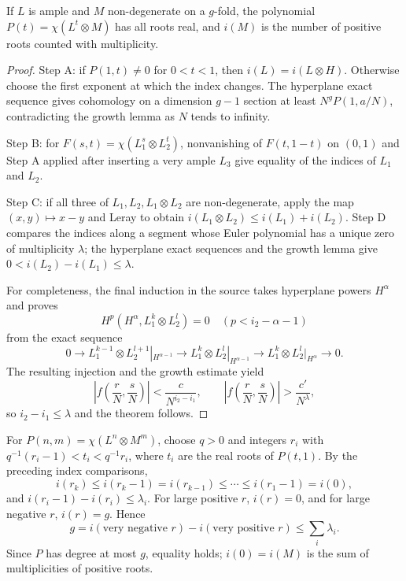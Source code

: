 \begin{theorem}
\label{mumford-thm-index-polynomial}
If $L$ is ample and $M$ non-degenerate on a $g$-fold, the polynomial
$P(t)=\chi(L^t\otimes M)$ has all roots real, and $i(M)$ is the number of
positive roots counted with multiplicity.
\end{theorem}
\begin{proof}
Step A: if $P(1,t)\ne0$ for $0<t<1$, then
$i(L)=i(L\otimes H)$. Otherwise choose the first exponent at which the
index changes. The hyperplane exact sequence gives cohomology on a
dimension $g-1$ section at least $N^gP(1,a/N)$, contradicting the growth
lemma as $N$ tends to infinity.

Step B: for $F(s,t)=\chi(L_1^s\otimes L_2^t)$, nonvanishing of
$F(t,1-t)$ on $(0,1)$ and Step A applied after inserting a very ample $L_3$
give equality of the indices of $L_1$ and $L_2$.

Step C: if all three of $L_1,L_2,L_1\otimes L_2$ are non-degenerate, apply
the map $(x,y)\mapsto x-y$ and Leray to obtain
$i(L_1\otimes L_2)\le i(L_1)+i(L_2)$. Step D compares the indices along a
segment whose Euler polynomial has a unique zero of multiplicity $\lambda$;
the hyperplane exact sequences and the growth lemma give
\(0<i(L_2)-i(L_1)\le\lambda\).

For completeness, the final induction in the source takes hyperplane powers
$H^\alpha$ and proves
\[
H^p(H^\alpha,L_1^k\otimes L_2^l)=0\quad(p<i_2-\alpha-1)
\]
from the exact sequence
\[
0\to L_1^{k-1}\otimes L_2^{l+1}|_{H^{\alpha-1}}
\to L_1^k\otimes L_2^l|_{H^{\alpha-1}}
\to L_1^k\otimes L_2^l|_{H^\alpha}\to0.
\]
The resulting injection and the growth estimate yield
\[
\left|f\left(\frac{r}{N},\frac{s}{N}\right)\right|<\frac{c}{N^{i_2-i_1}},
\qquad
\left|f\left(\frac{r}{N},\frac{s}{N}\right)\right|>\frac{c'}{N^\lambda},
\]
so $i_2-i_1\le\lambda$ and the theorem follows.
\end{proof}

\begin{remark}
\label{mumford-rem-index-root-count-conclusion}
For $P(n,m)=\chi(L^n\otimes M^m)$, choose $q>0$ and integers $r_i$ with
$q^{-1}(r_i-1)<t_i<q^{-1}r_i$, where $t_i$ are the real roots of
$P(t,1)$. By the preceding index comparisons,
\[
i(r_k)\le i(r_k-1)=i(r_{k-1})\le\cdots\le i(r_1-1)=i(0),
\]
and $i(r_i-1)-i(r_i)\le\lambda_i$. For large positive $r$, $i(r)=0$,
and for large negative $r$, $i(r)=g$. Hence
\[
g=i(\text{very negative }r)-i(\text{very positive }r)\le\sum_i\lambda_i.
\]
Since $P$ has degree at most $g$, equality holds; $i(0)=i(M)$ is the sum
of multiplicities of positive roots.
\end{remark}

